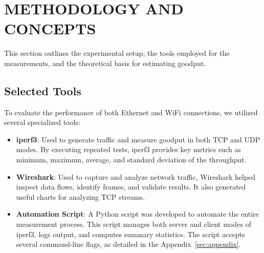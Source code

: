 
\section{METHODOLOGY AND CONCEPTS} \label{sec:methodology-and-concepts}


    This section outlines the experimental setup, the tools employed for the measurements, and the theoretical basis for estimating goodput.

    \subsection{Selected Tools} \label{subsec:selected-tools}

        To evaluate the performance of both Ethernet and WiFi connections, we utilized several specialized tools:

        \begin{itemize}
            \item \textbf{iperf3}: Used to generate traffic and measure goodput in both TCP and UDP modes. By executing repeated tests, iperf3 provides key metrics such as minimum, maximum, average, and standard deviation of the throughput.
            \item \textbf{Wireshark}: Used to capture and analyze network traffic, Wireshark helped inspect data flows, identify frames, and validate results. It also generated useful charts for analyzing TCP streams.
            \item \textbf{Automation Script}: A Python script was developed to automate the entire measurement process. This script manages both server and client modes of iperf3, logs output, and computes summary statistics. 
                The script accepts several command-line flags, as detailed in the Appendix~\ref{sec:appendix}.
        \end{itemize}

